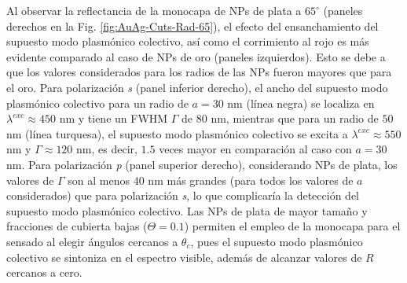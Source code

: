 Al observar la reflectancia de la monocapa de NPs de plata a $65^\circ$ (paneles derechos en la Fig. \ref{fig:AuAg-Cuts-Rad-65}), el efecto del ensanchamiento del supuesto modo plasmónico colectivo, así como el corrimiento al rojo es más evidente comparado al caso de NPs de oro (paneles izquierdos). Esto se debe a  que los valores considerados para los radios de las NPs fueron mayores que para el oro.  Para polarización \emph{s} (panel inferior derecho), el ancho del supuesto modo plasmónico colectivo para un radio de $a=30$ nm (línea negra) se localiza en $\lambda^{exc}\approx 450$ nm y tiene un FWHM $\Gamma$ de $80$ nm, mientras que para un radio de $50$ nm (línea turquesa), el supuesto modo plasmónico colectivo se excita a $\lambda^{exc}\approx 550$ nm y $\Gamma\approx 120$ nm, es decir, $1.5$ veces mayor en comparación al caso con $a=30$ nm. Para polarización \emph{p} (panel superior derecho), considerando NPs de plata, los valores de $\Gamma$ son al menos $40$ nm más grandes (para todos los valores de $a$ considerados) que para polarización \emph{s}, lo que complicaría la detección del supuesto modo plasmónico colectivo. Las NPs de plata de mayor tamaño y fracciones de cubierta bajas ($\Theta= 0.1$) permiten el empleo de la monocapa para el sensado al elegir ángulos cercanos a $\theta_c$, pues el supuesto modo plasmónico colectivo se sintoniza en el espectro visible, además de alcanzar valores de $R$ cercanos a cero.%

